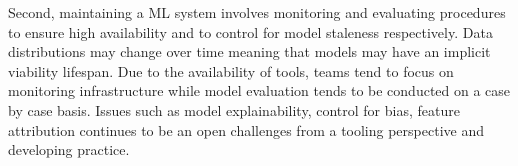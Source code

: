 Second, maintaining a ML system involves monitoring and evaluating procedures to ensure high availability and to control for model staleness respectively. Data distributions may change over time meaning that models may have an implicit viability lifespan. Due to the availability of tools, teams tend to focus on monitoring infrastructure while model evaluation tends to be conducted on a case by case basis. Issues such as model explainability, control for bias, feature attribution continues to be an open challenges from a tooling perspective and developing practice. 



